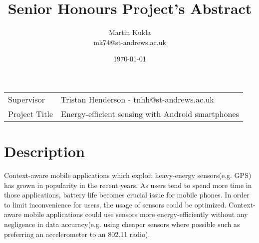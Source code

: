 \documentclass[a4page]{article}
\author{Martin Kukla \\
mk74@st-andrews.ac.uk}
\title{Senior Honours Project's Abstract}
\date{\today}
\begin{document}
\maketitle

\begin{table}[!th]
\begin{tabular}{l p{}}
Supervisor & Tristan Henderson - tnhh@st-andrews.ac.uk\\
Project Title & Energy-efficient sensing with Android smartphones \\
\end{tabular}
\end{table}

\section{Description}
Context-aware mobile applications which exploit heavy-energy sensors(e.g. GPS) has grown in popularity in the recent years. As users tend to spend more time in those applications, battery life becomes crucial issue for mobile phones. In order to limit inconvenience for users, the usage of sensors could be optimized. Context-aware mobile applications could use sensors more energy-efficiently without any negligence in data accuracy(e.g. using cheaper sensors where possible such as preferring an accelerometer to an 802.11 radio).
\end{document}
